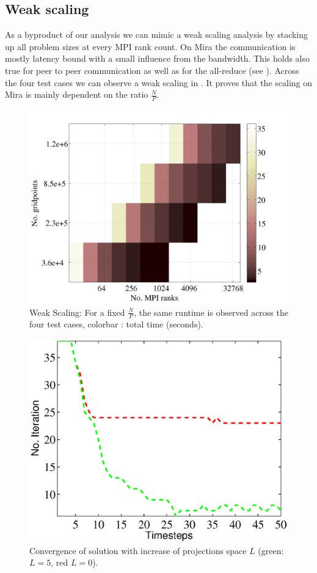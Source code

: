 \documentclass{sig-alternate}
\begin{document}
\subsection{Weak scaling}
As a byproduct of our analysis we can mimic a weak scaling analysis by stacking up 
all problem sizes at every MPI rank count. On Mira the communication is mostly 
latency bound with a small influence from the
bandwidth. This holds also true for peer to peer communication as well as for the
all-reduce (see ). Across the four test cases we can observe 
a weak scaling in . It proves that the scaling on Mira is 
mainly dependent on the ratio $\frac{N}{P}$. 
\begin{figure}
  \centering
  \includegraphics[width=\linewidth]{./figures/weak.png}
  \caption{Weak Scaling: For a fixed $\frac{N}{P}$, the same runtime is
  observed across the four test cases, colorbar : total time (seconds).}
  \label{fig:weakscaling}
\end{figure}

\begin{figure}
  \centering
  \includegraphics[width=\linewidth]{./figures/projections.eps}
  \caption{Convergence of solution with increase of projections space $L$ (green: $L=5$, red $L=0$).}
  \label{fig:projections}
\end{figure}
\end{document}
